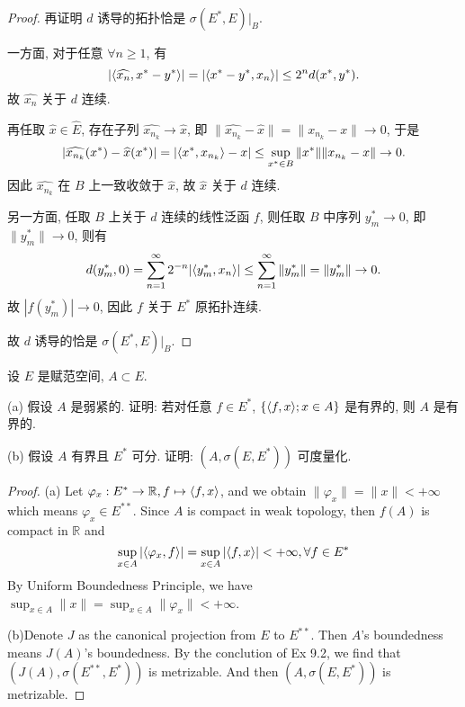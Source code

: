 \begin{proof}
    再证明 $d$ 诱导的拓扑恰是 $\sigma(E^*,E)|_B$.

    一方面, 对于任意 $\forall n\geq 1$, 有
    \[|\langle\widehat{x_n},x^*-y^*\rangle|=|\langle x^*-y^*,x_n\rangle|\leq 2^n d(x^*,y^*).\]
    故 $\widehat{x_n}$ 关于 $d$ 连续.

    再任取 $\widehat{x}\in\widehat{E}$, 存在子列 $\widehat{x_{n_k}}\to\widehat{x}$,
    即 $\|\widehat{x_{n_k}}-\widehat{x}\|=\|x_{n_k}-x\|\to 0$, 于是
    \[|\widehat{x_{n_k}}(x^*)-\widehat{x}(x^*)|=|\langle x^*,x_{n_k}\rangle-x|\leq\sup_{x^*\in B}\|x^*\|\|x_{n_k}-x\|\to 0.\]
    因此 $\widehat{x_{n_k}}$ 在 $B$ 上一致收敛于 $\widehat{x}$, 故 $\widehat{x}$ 关于 $d$ 连续.

    另一方面, 任取 $B$ 上关于 $d$ 连续的线性泛函 $f$, 则任取 $B$ 中序列 $y_m^*\to 0$,
    即 $\|y_m^*\|\to 0$, 则有
    \[d(y_m^*,0)=\sum_{n=1}^{\infty}2^{-n}|\langle y_m^*,x_n\rangle|\leq\sum_{n=1}^{\infty}\|y_m^*\|=\|y_m^*\|\to 0.\]
    故 $|f(y_m^*)|\to 0$, 因此 $f$ 关于 $E^*$ 原拓扑连续.

    故 $d$ 诱导的恰是 $\sigma(E^*,E)|_B$.
\end{proof}



\begin{exercise}
    设 $E$ 是赋范空间, $A\subset E$.

    (a) 假设 $A$ 是弱紧的. 证明: 若对任意 $f\in E^*$, $\{\langle f,x\rangle; x\in A\}$ 是有界的, 则 $A$ 是有界的.

    (b) 假设 $A$ 有界且 $E^*$ 可分. 证明: $(A, \sigma(E, E^*))$ 可度量化.
\end{exercise}

\begin{proof}
    (a) Let $\varphi_x : E^*\to \mathbb R,f\mapsto \langle f,x\rangle$, and we obtain $\|\varphi_x\| = \|x\| < +\infty$ which means $\varphi_x\in E^{**}$. Since $A$ is compact in weak topology, then $f(A)$ is compact in $\mathbb R$ and 
    \[ \sup_{x\in A}|\langle\varphi_x,f\rangle| = \sup_{x\in A} |\langle f,x\rangle| < +\infty, \forall f \in E^* \]
    By Uniform Boundedness Principle, we have $\sup_{x\in A}\|x\| = \sup_{x\in A} \|\varphi_x\| < +\infty$. 
        
    (b)Denote $J$ as the canonical projection from $E$ to $E^{**}$. Then $A$'s boundedness means $J(A)$'s boundedness. By the conclution of Ex 9.2, we find that $(J(A), \sigma(E^{**}, E^{*}))$ is metrizable. And then $(A, \sigma(E, E^*))$ is metrizable. 
\end{proof}



